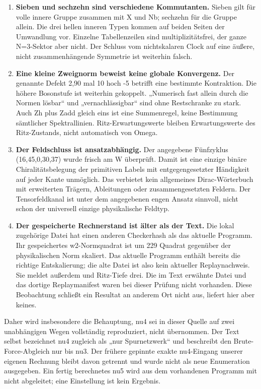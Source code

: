 \begin{enumerate}
\def\labelenumi{\arabic{enumi}.}
\tightlist
\item
  \textbf{Sieben und sechzehn sind verschiedene Kommutanten.} Sieben
  gilt für volle innere Gruppe zusammen mit X und Nb; sechzehn für die
  Gruppe allein. Die drei hellen inneren Typen kommen auf beiden Seiten
  der Umwandlung vor. Einzelne Tabellenzeilen sind multiplizitätsfrei,
  der ganze N=3-Sektor aber nicht. Der Schluss vom nichtskalaren Clock
  auf eine äußere, nicht zusammenhängende Symmetrie ist weiterhin
  falsch.
\item
  \textbf{Eine kleine Zweignorm beweist keine globale Konvergenz.} Der
  genannte Defekt 2,90 mal 10 hoch -5 betrifft eine bestimmte
  Kontraktion. Die höhere Bosonstufe ist weiterhin gekoppelt. „Numerisch
  fast allein durch die Normen lösbar`` und „vernachlässigbar`` sind
  ohne Restschranke zu stark. Auch Zh plus Zadd gleich eins ist eine
  Summenregel, keine Bestimmung sämtlicher Spektrallinien.
  Ritz-Erwartungswerte bleiben Erwartungswerte des Ritz-Zustands, nicht
  automatisch von Omega.
\item
  \textbf{Der Feldschluss ist ansatzabhängig.} Der angegebene Fünfzyklus
  (16,45,0,30,37) wurde frisch am W überprüft. Damit ist eine einzige
  binäre Chiralitätsbelegung der primitiven Labels mit entgegengesetzter
  Händigkeit auf jeder Kante unmöglich. Das verbietet kein allgemeines
  Dirac-Wörterbuch mit erweiterten Trägern, Ableitungen oder
  zusammengesetzten Feldern. Der Tensorfeldkanal ist unter dem
  angegebenen engen Ansatz sinnvoll, nicht schon der universell einzige
  physikalische Feldtyp.
\item
  \textbf{Der gespeicherte Rechnerstand ist älter als der Text.} Die
  lokal zugehörige Datei  hat einen
  anderen Checkerhash als das aktuelle Programm. Ihr gespeichertes
  w2-Normquadrat ist um 229 Quadrat gegenüber der physikalischen Norm
  skaliert. Das aktuelle Programm enthält bereits die richtige
  Entskalierung; die alte Datei ist also kein aktueller Replaynachweis.
  Sie meldet außerdem  und
  Ritz-Tiefe drei. Die im Text erwähnte Datei
   und das dortige Replaymanifest waren
  bei dieser Prüfung nicht vorhanden. Diese Beobachtung schließt ein
  Resultat an anderem Ort nicht aus, liefert hier aber keines.
\end{enumerate}

Daher wird insbesondere die Behauptung, nu4 sei in dieser Quelle auf
zwei unabhängigen Wegen vollständig reproduziert, nicht übernommen. Der
Text selbst bezeichnet nu4 zugleich als „nur Spurnetzwerk`` und
beschreibt den Brute-Force-Abgleich nur bis nu3. Der frühere gepinnte
exakte nu4-Eingang unserer eigenen Rechnung bleibt davon getrennt und
wurde nicht als neue Enumeration ausgegeben. Ein fertig berechnetes nu5
wird aus dem vorhandenen Programm mit  nicht
abgeleitet; eine Einstellung ist kein Ergebnis.

